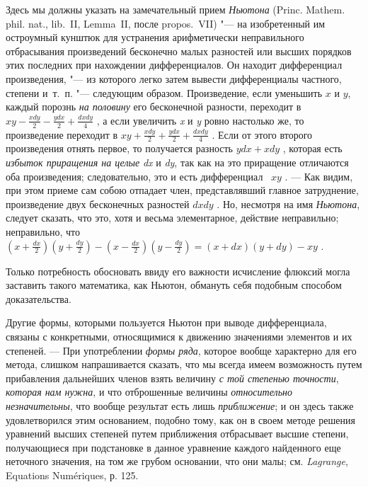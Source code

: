 Здесь мы должны указать на замечательный прием {\em Ньютона}
(Princ. Mathem. phil. nat., lib.~II, Lemma~II, после propos.~VII)
"--- на изобретенный им остроумный кунштюк для устранения арифметически
неправильного отбрасывания произведений бесконечно малых разностей или
высших порядков этих последних при нахождении дифференциалов. Он находит
дифференциал произведения, "--- из которого легко затем вывести дифференциалы
частного, степени и~т.~п. "--- следующим образом. Произведение, если уменьшить
$x$ и $y$, каждый порознь
{\em на половину} его бесконечной разности, переходит в
 $\mathit{xy}-\frac{\mathit{xdy}} 2-\frac{\mathit{ydx}}
2+\frac{\mathit{dxdy}} 4$ , а если увеличить {\em x} и
{\em y} ровно настолько же, то произведение переходит в
 $\mathit{xy}+\frac{\mathit{xdy}} 2+\frac{\mathit{ydx}}
2+\frac{\mathit{dxdy}} 4$ . Если от этого второго произведения отнять
первое, то получается разность  $\mathit{ydx}+\mathit{xdy}$ , которая есть
{\em избыток приращения на целые}
{\em dx} и {\em dy}, так как на это
приращение отличаются оба произведения; следовательно, это и есть
дифференциал \  $\mathit{xy}$ . — Как видим, при этом приеме сам собою
отпадает член, представлявший главное затруднение, произведение двух
бесконечных разностей  $\mathit{dxdy}$ . Но, несмотря на имя
{\em Ньютона}, следует сказать, что это, хотя и весьма
элементарное, действие неправильно; неправильно, что 
$\left(x+\frac{\mathit{dx}} 2\right)\left(y+\frac{\mathit{dy}}
2\right)-\left(x-\frac{\mathit{dx}} 2\right)\left(y-\frac{\mathit{dy}}
2\right)=\left(x+\mathit{dx}\right)\left(y+\mathit{dy}\right)-\mathit{xy}$
.

Только потребность обосновать ввиду его важности исчисление флюксий могла
заставить такого математика, как Ньютон, обмануть себя подобным способом
доказательства.

Другие формы, которыми пользуется Ньютон при выводе дифференциала, связаны с
конкретными, относящимися к движению значениями элементов и их степеней. —
При употреблении {\em формы ряда}, которое вообще
характерно для его метода, слишком напрашивается сказать, что мы всегда
имеем возможность путем прибавления дальнейших членов взять величину
{\em с той степенью точности},
{\em которая нам нужна}, и что отброшенные величины
{\em относительно незначительны}, что вообще результат
есть лишь {\em приближение}; и он здесь также
удовлетворился этим основанием, подобно тому, как он в своем методе решения
уравнений высших степеней путем приближения отбрасывает высшие степени,
получающиеся при подстановке в данное уравнение каждого найденного еще
неточного значения, на том же грубом основании, что они малы; см.
{\em Lagrange}, Equations Numériques, р. 125.

